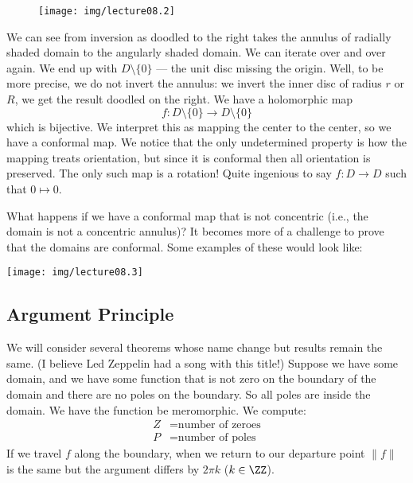 \begin{wrapfigure}[7]{r}{1.05in}
\vspace{-35pt}
\begin{center}
\texttt{[image: img/lecture08.2]}
\end{center}
\end{wrapfigure}
We can see from inversion as doodled to the right takes the
annulus of radially shaded domain to the angularly shaded
domain. We can iterate over and over again. We end up with
$D\setminus\{0\}$ --- the unit disc missing the origin.
Well, to be more precise, we do not invert the annulus: we invert
the inner disc of radius $r$ or $R$, we get the result doodled on
the right. We have a holomorphic map
\begin{equation}
f\colon D\setminus\{0\}\to D\setminus\{0\}
\end{equation}
which is bijective. We interpret this as mapping the center to
the center, so we have a conformal map. We notice that the only
undetermined property is how the mapping treats orientation, but
since it is conformal then all orientation is preserved. The only
such map is a rotation! Quite ingenious to say $f\colon D\to D$
such that $0\mapsto 0$.

What happens if we have a conformal map that is not concentric
(i.e., the domain is not a concentric annulus)? It becomes more
of a challenge to prove that the domains are conformal. Some
examples of these would look like:
\begin{center}
\texttt{[image: img/lecture08.3]}
\end{center}

\subsection{Argument Principle}
We will consider several theorems whose name change but results
remain the same. (I believe Led Zeppelin had a song with this
title!) Suppose we have some domain, and we have some function
that is not zero on the boundary of the domain and there are no
poles on the boundary. So all poles are inside the domain. We
have the function be meromorphic. We compute:
\begin{equation}
\begin{split}
Z &= \mbox{number of zeroes}\\
P &= \mbox{number of poles}
\end{split}
\end{equation}
If we travel $f$ along the boundary, when we return to our
departure point $\|f\|$ is the same but the argument differs by
$2\pi k$ ($k\in\ZZ$).

